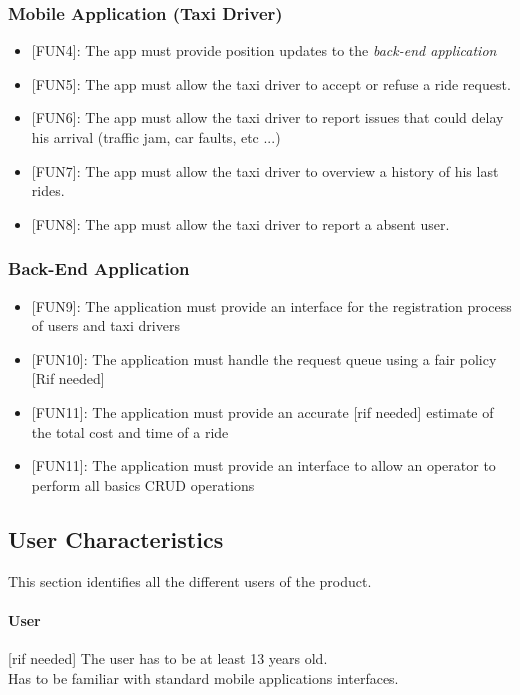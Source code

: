 \documentclass[12pt, a4paper]{article}
\begin{document}
\subsubsection{Mobile Application (Taxi Driver)} 
\label{ssub:mobile_application_}
\begin{itemize}
	\item {[FUN4\label{itm:FUN4}]}: The app must provide position updates to the \emph{back-end application}
	\item {[FUN5\label{itm:FUN5}]}: The app must allow the taxi driver to accept or refuse a ride request.
	\item {[FUN6\label{itm:FUN6}]}: The app must allow the taxi driver to report issues that could delay his arrival (traffic jam, car faults, etc ...)
	\item {[FUN7\label{itm:FUN7}]}: The app must allow the taxi driver to overview a history of his last rides.
	\item {[FUN8\label{itm:FUN8}]}: The app must allow the taxi driver to report a absent user.
\end{itemize}

\subsubsection{Back-End Application} 
\label{ssub:back_end_application}
\begin{itemize}
	\item {[FUN9\label{itm:FUN9}]}: The application must provide an interface for the registration process of users and taxi drivers
	\item {[FUN10\label{itm:FUN10}]}: The application must handle the request queue using a fair policy [Rif needed]
	\item {[FUN11\label{itm:FUN11}]}: The application must provide an accurate [rif needed] estimate of the total cost and time of a ride
	\item {[FUN11\label{itm:FUN12}]}: The application must provide an interface to allow an operator to perform all basics CRUD operations

\end{itemize}

\subsection{User Characteristics} 
\label{sub:user_characteristics}
This section identifies all the different users of the product.
\paragraph{User}\label{par:user} [rif needed] The user has to be at least 13 years old.\\ 
Has to be familiar with standard mobile applications interfaces.
\end{document}
